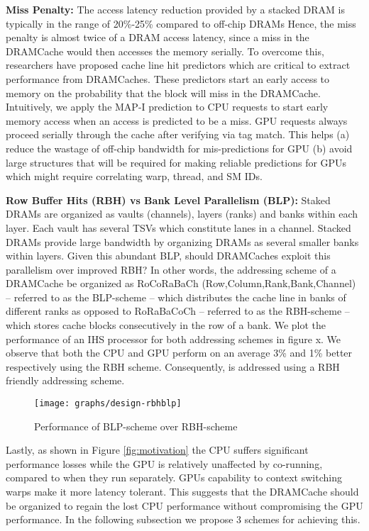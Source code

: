 \par \textbf{Miss Penalty:} The access latency reduction provided by a stacked DRAM is typically in the range of 20\%-25\% compared to off-chip DRAMs Hence, the miss penalty is almost twice of a DRAM access latency, since a miss in the DRAMCache would then accesses the memory serially. To overcome this, researchers have proposed cache line hit predictors \cite{loh-hill,alloy} which are critical to extract performance from DRAMCaches. These predictors start an early access to memory on the probability that the block will miss in the DRAMCache. Intuitively, we apply the MAP-I prediction \cite{alloy} to CPU requests to start early memory access when an access is predicted to be a miss. GPU requests always proceed serially through the cache after verifying via tag match. This helps (a) reduce the wastage of off-chip bandwidth for mis-predictions for GPU (b) avoid large structures that will be required for making reliable predictions for GPUs which might require correlating warp, thread, and SM IDs.

\par \textbf{Row Buffer Hits (RBH) vs Bank Level Parallelism (BLP):} Staked DRAMs are organized as vaults (channels), layers (ranks) and banks within each layer. Each vault has several TSVs which constitute lanes in a channel. Stacked DRAMs provide large bandwidth by organizing DRAMs as several smaller banks within layers. Given this abundant BLP, should DRAMCaches exploit this parallelism over improved RBH? In other words, the addressing scheme of a DRAMCache be organized as RoCoRaBaCh (Row,Column,Rank,Bank,Channel) -- referred to as the BLP-scheme -- which distributes the cache line in banks of different ranks as opposed to RoRaBaCoCh -- referred to as the RBH-scheme -- which stores cache blocks consecutively in the row of a bank. We plot the performance of an IHS processor for both addressing schemes in figure x. We observe that both the CPU and GPU perform on an average 3\% and 1\% better respectively using the RBH scheme. Consequently, \cachename is addressed using a RBH friendly addressing scheme. 

\begin{figure}[htbp]
   \texttt{[image: graphs/design-rbhblp]}
   \caption{Performance of BLP-scheme over RBH-scheme}
   \label{fig:design-rbhblp}
\end{figure}

\par Lastly, as shown in Figure \ref{fig:motivation} the CPU suffers significant performance losses while the GPU is relatively unaffected by co-running, compared to when they run separately. GPUs capability to context switching warps make it more latency tolerant. This suggests that the DRAMCache should be organized to regain the lost CPU performance without compromising the GPU performance.  In the following subsection we propose 3 schemes for achieving this. 